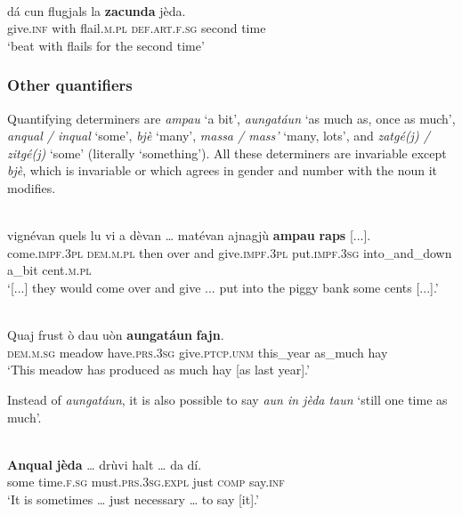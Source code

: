 \ea\label{}
\\
\gll  dá cun flugjals la \textbf{zacunda} jèda.\\
    give.\textsc{inf} with flail.\textsc{m.pl} \textsc{def.art.f.sg} second time \\
\glt `beat with flails for the second time'
\z

\subsubsection{Other quantifiers}
Quantifying determiners are \textit{ampau} `a bit', \textit{aungatáun} `as much as, once as much', \textit{anqual / inqual} `some', \textit{bjè} `many', \textit{massa / mass'} `many, lots', and \textit{zatgé(j) / zitgé(j)} `some' (literally `something'). All these determiners are invariable except \textit{bjè}, which is invariable or which agrees in gender and number with the noun it modifies.


\ea\label{}
\\
\gll    [...] vignévan quels lu vi a dèvan … matévan ajnagjù \textbf{ampau} \textbf{raps} [...].\\
 {} come.\textsc{impf.3pl} \textsc{dem.m.pl} then over and give.\textsc{impf.3pl} {} put.\textsc{impf.3sg} into\_and\_down a\_bit cent.\textsc{m.pl}\\
\glt `[...] they would come over and give ... put into the piggy bank some cents [...].'
\z

\ea\label{}
\\
\gll  Quaj frust ò dau uòn \textbf{aungatáun} \textbf{fajn}. \\
\textsc{dem.m.sg} meadow have.\textsc{prs.3sg} give.\textsc{ptcp.unm} this\_year as\_much hay \\
\glt `This meadow has produced as much hay [as last year].'
\z

Instead of \textit{aungatáun}, it is also possible to say \textit{aun in jèda taun} `still one time as much'.

\ea
\label{}
\\
\gll  \textbf{Anqual} \textbf{jèda} … drùvi halt … da dí.\\
some time.\textsc{f.sg} {} must.\textsc{prs.3sg.expl} just {} \textsc{comp} say.\textsc{inf}\\
\glt `It is sometimes … just necessary … to say [it].'
\z


